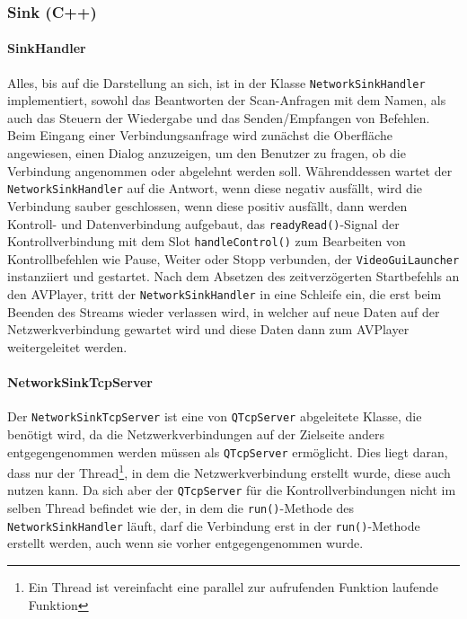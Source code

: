 \documentclass{article}
\begin{document}
    \subsubsection{Sink (C++)}\label{subsubsec:sink-(c++)}

    \paragraph{SinkHandler}
    Alles, bis auf die Darstellung an sich, ist in der Klasse \texttt{NetworkSinkHandler} implementiert,
    sowohl das Beantworten der Scan-Anfragen mit dem Namen, als auch das Steuern der Wiedergabe und das Senden/Empfangen von Befehlen.
    Beim Eingang einer Verbindungsanfrage wird zunächst die Oberfläche angewiesen, einen Dialog anzuzeigen, um den Benutzer zu fragen,
    ob die Verbindung angenommen oder abgelehnt werden soll.
    Währenddessen wartet der \texttt{NetworkSinkHandler} auf die Antwort, wenn diese negativ ausfällt, wird die Verbindung sauber geschlossen,
    wenn diese positiv ausfällt, dann werden Kontroll- und Datenverbindung aufgebaut, das \texttt{readyRead()}-Signal der Kontrollverbindung mit
    dem Slot \texttt{handleControl()} zum Bearbeiten von Kontrollbefehlen wie Pause, Weiter oder Stopp verbunden, der \texttt{VideoGuiLauncher} instanziiert und gestartet.
    Nach dem Absetzen des zeitverzögerten Startbefehls an den AVPlayer, tritt der \texttt{NetworkSinkHandler} in eine Schleife ein,
    die erst beim Beenden des Streams wieder verlassen wird, in welcher auf neue Daten auf der Netzwerkverbindung gewartet wird
    und diese Daten dann zum AVPlayer weitergeleitet werden.

    \paragraph{NetworkSinkTcpServer}
    Der \texttt{NetworkSinkTcpServer} ist eine von \texttt{QTcpServer} abgeleitete Klasse, die benötigt wird,
    da die Netzwerkverbindungen auf der Zielseite anders entgegengenommen werden müssen als \texttt{QTcpServer} ermöglicht.
    Dies liegt daran, dass nur der Thread\footnote{\label{footnoteThread}Ein Thread ist vereinfacht eine parallel zur aufrufenden Funktion laufende Funktion},
    in dem die Netzwerkverbindung erstellt wurde, diese auch nutzen kann.
    Da sich aber der \texttt{QTcpServer} für die Kontrollverbindungen nicht im selben Thread befindet wie der,
    in dem die \texttt{run()}-Methode des \texttt{NetworkSinkHandler} läuft,
    darf die Verbindung erst in der \texttt{run()}-Methode erstellt werden,
    auch wenn sie vorher entgegengenommen wurde.
\end{document}
